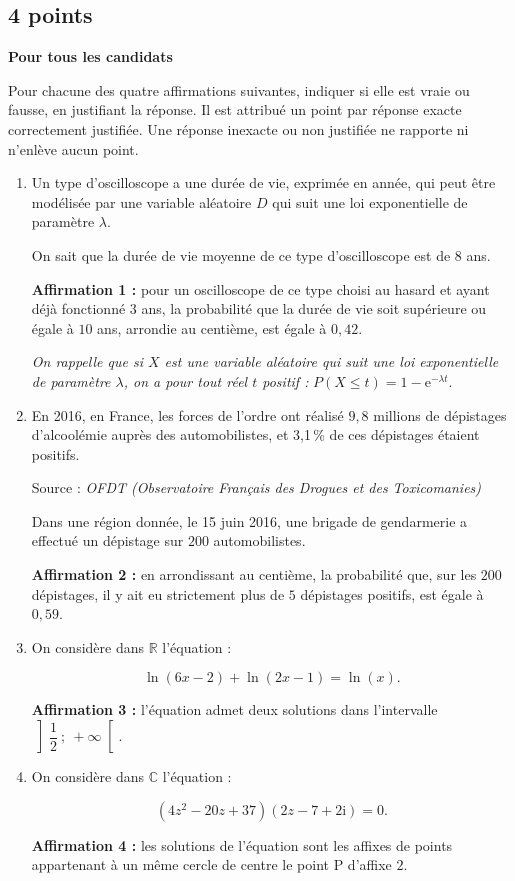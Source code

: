 \documentclass[10pt]{article}
\newcommand{\R}{\mathbb{R}}
\newcommand{\C}{\mathbb{C}}
\begin{document}
\subsection{\hfill 4 points}
 
\textbf{Pour tous les candidats}

\medskip

Pour chacune des quatre affirmations suivantes, indiquer si elle est vraie ou fausse, en justifiant la
réponse. Il est attribué un point par réponse exacte correctement justifiée. Une réponse inexacte ou
non justifiée ne rapporte ni n'enlève aucun point.

\bigskip

\begin{enumerate}
\item Un type d'oscilloscope a une durée de vie, exprimée en année, qui peut être modélisée par une
variable aléatoire $D$ qui suit une loi exponentielle de paramètre $\lambda$.

On sait que la durée de vie moyenne de ce type d'oscilloscope est de $8$ ans.

\smallskip

\textbf{Affirmation 1 :} pour un oscilloscope de ce type choisi au hasard et ayant déjà fonctionné $3$ ans,
la probabilité que la durée de vie soit supérieure ou égale à $10$ ans, arrondie au centième, est
égale à $0,42$.

\emph{On rappelle que si $X$ est une variable aléatoire qui suit une loi exponentielle de paramètre $\lambda$, on a pour tout réel $t$ positif :} $P(X \leqslant t) = 1 - \text{e}^{-\lambda t}$.
\item  En 2016, en France, les forces de l'ordre ont réalisé $9,8$ millions de dépistages d'alcoolémie
auprès des automobilistes, et 3,1\,\% de ces dépistages étaient positifs.

Source : \emph{OFDT (Observatoire Français des Drogues et des Toxicomanies)}

Dans une région donnée, le 15 juin 2016, une brigade de gendarmerie a effectué un dépistage
sur $200$ automobilistes.

\smallskip

\textbf{Affirmation 2 :} en arrondissant au centième, la probabilité que, sur les $200$ dépistages, il y ait
eu strictement plus de $5$ dépistages positifs, est égale à $0,59$.
\item  On considère dans $\R$ l'équation :

\[\ln (6 x - 2) + \ln (2x - 1) = \ln (x).\]

\smallskip

\textbf{Affirmation 3 :} l'équation admet deux solutions dans l'intervalle $\left]\dfrac{1}{2}~;~+ \infty\right[$.
\item  On considère dans $\C$ l'équation : 

\[\left(4z^2 - 20z + 37\right)(2z -7 + 2\text{i}) = 0.\]


\smallskip

\textbf{Affirmation 4 :} les solutions de l'équation sont les affixes de points appartenant à un même
cercle de centre le point P d'affixe $2$.
\end{enumerate}
\end{document}
